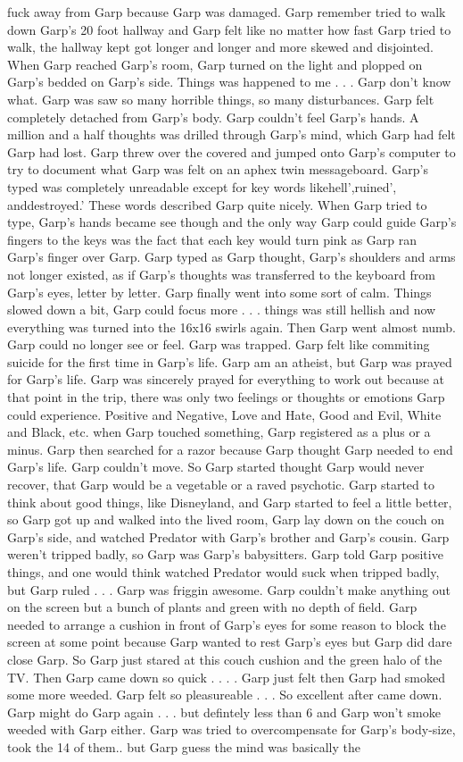 \documentclass[12pt]{book}
\begin{document}
fuck away from Garp because Garp was damaged. Garp remember tried to walk down Garp's 20 foot hallway and Garp felt like no matter how fast Garp tried to walk, the hallway kept got longer and longer and more skewed and disjointed. When Garp reached Garp's room, Garp turned on the light and plopped on Garp's bedded on Garp's side. Things was happened to me . . .  Garp don't know what. Garp was saw so many horrible things, so many disturbances. Garp felt completely detached from Garp's body. Garp couldn't feel Garp's hands. A million and a half thoughts was drilled through Garp's mind, which Garp had felt Garp had lost. Garp threw over the covered and jumped onto Garp's computer to try to document what Garp was felt on an aphex twin messageboard. Garp's typed was completely unreadable except for key words likehell',ruined', anddestroyed.' These words described Garp quite nicely. When Garp tried to type, Garp's hands became see though and the only way Garp could guide Garp's fingers to the keys was the fact that each key would turn pink as Garp ran Garp's finger over Garp. Garp typed as Garp thought, Garp's shoulders and arms not longer existed, as if Garp's thoughts was transferred to the keyboard from Garp's eyes, letter by letter. Garp finally went into some sort of calm. Things slowed down a bit, Garp could focus more . . .  things was still hellish and now everything was turned into the 16x16 swirls again. Then Garp went almost numb. Garp could no longer see or feel. Garp was trapped. Garp felt like commiting suicide for the first time in Garp's life. Garp am an atheist, but Garp was prayed for Garp's life. Garp was sincerely prayed for everything to work out because at that point in the trip, there was only two feelings or thoughts or emotions Garp could experience. Positive and Negative, Love and Hate, Good and Evil, White and Black, etc. when Garp touched something, Garp registered as a plus or a minus. Garp then searched for a razor because Garp thought Garp needed to end Garp's life. Garp couldn't move. So Garp started thought Garp would never recover, that Garp would be a vegetable or a raved psychotic. Garp started to think about good things, like Disneyland, and Garp started to feel a little better, so Garp got up and walked into the lived room, Garp lay down on the couch on Garp's side, and watched Predator with Garp's brother and Garp's cousin. Garp weren't tripped badly, so Garp was Garp's babysitters. Garp told Garp positive things, and one would think watched Predator would suck when tripped badly, but Garp ruled . . .  Garp was friggin awesome. Garp couldn't make anything out on the screen but a bunch of plants and green with no depth of field. Garp needed to arrange a cushion in front of Garp's eyes for some reason to block the screen at some point because Garp wanted to rest Garp's eyes but Garp did dare close Garp. So Garp just stared at this couch cushion and the green halo of the TV. Then Garp came down so quick . . .  . Garp just felt then Garp had smoked some more weeded. Garp felt so pleasureable . . .  So excellent after came down. Garp might do Garp again . . .  but defintely less than 6 and Garp won't smoke weeded with Garp either. Garp was tried to overcompensate for Garp's body-size, took the 14 of them.. but Garp guess the mind was basically the 
\end{document}
